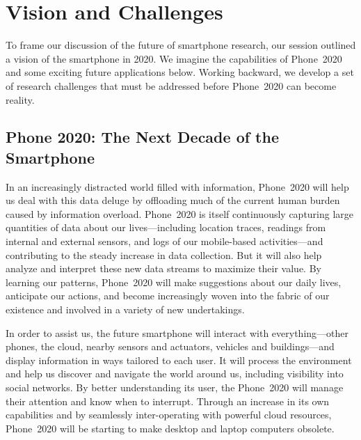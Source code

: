 \section{Vision and Challenges}

To frame our discussion of the future of smartphone research, our session
outlined a vision of the smartphone in 2020. We imagine the capabilities of
Phone~2020 and some exciting future applications below. Working backward, we
develop a set of research challenges that must be addressed before Phone~2020
can become reality.

\subsection{Phone 2020: The Next Decade of the Smartphone}

In an increasingly distracted world filled with information, Phone~2020 will
help us deal with this data deluge by offloading much of the current human
burden caused by information overload. Phone~2020 is itself continuously
capturing large quantities of data about our lives---including location
traces, readings from internal and external sensors, and logs of our
mobile-based activities---and contributing to the steady increase in data
collection. But it will also help analyze and interpret these new data
streams to maximize their value. By learning our patterns, Phone~2020 will
make suggestions about our daily lives, anticipate our actions, and become
increasingly woven into the fabric of our existence and involved in a variety
of new undertakings.
 
In order to assist us, the future smartphone will interact with
everything---other phones, the cloud, nearby sensors and actuators, vehicles
and buildings---and display information in ways tailored to each user. It
will process the environment and help us discover and navigate the world
around us, including visibility into social networks. By better understanding
its user, the Phone~2020 will manage their attention and know when to
interrupt. Through an increase in its own capabilities and by seamlessly
inter-operating with powerful cloud resources, Phone~2020 will be starting to
make desktop and laptop computers obsolete.
 
